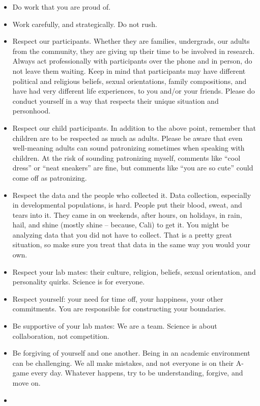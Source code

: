 \documentclass[
]{book}
\providecommand{\tightlist}{%
  \setlength{\itemsep}{0pt}\setlength{\parskip}{0pt}}
\begin{document}
\begin{itemize}
\tightlist
\item
  Do work that you are proud of.
\item
  Work carefully, and strategically. Do not rush.
\item
  Respect our participants. Whether they are families, undergrads, our adults from the community, they are giving up their time to be involved in research. Always act professionally with participants over the phone and in person, do not leave them waiting. Keep in mind that participants may have different political and religious beliefs, sexual orientations, family compositions, and have had very different life experiences, to you and/or your friends. Please do conduct yourself in a way that respects their unique situation and personhood.
\item
  Respect our child participants. In addition to the above point, remember that children are to be respected as much as adults. Please be aware that even well-meaning adults can sound patronizing sometimes when speaking with children. At the risk of sounding patronizing myself, comments like ``cool dress'' or ``neat sneakers'' are fine, but comments like ``you are so cute'' could come off as patronizing.
\item
  Respect the data and the people who collected it. Data collection, especially in developmental populations, is hard. People put their blood, sweat, and tears into it. They came in on weekends, after hours, on holidays, in rain, hail, and shine (mostly shine -- because, Cali) to get it. You might be analyzing data that you did not have to collect. That is a pretty great situation, so make sure you treat that data in the same way you would your own.
\item
  Respect your lab mates: their culture, religion, beliefs, sexual orientation, and personality quirks. Science is for everyone.
\item
  Respect yourself: your need for time off, your happiness, your other commitments. You are responsible for constructing your boundaries.
\item
  Be supportive of your lab mates: We are a team. Science is about collaboration, not competition.
\item
  Be forgiving of yourself and one another. Being in an academic environment can be challenging. We all make mistakes, and not everyone is on their A-game every day. Whatever happens, try to be understanding, forgive, and move on.
\item

\end{itemize}
\end{document}
